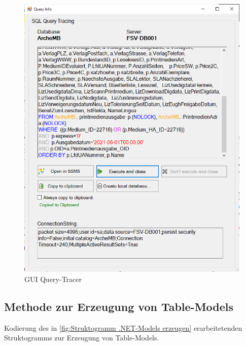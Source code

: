\documentclass[11pt,toc=sectionentrywithoutdots, 
headheight=44pt, headings=optiontoheadandtoc, hyperfootnotes=false, hypertexnames=false]{scrartcl}
\begin{document}
 \begin{figure}[H]
 \centering

	\includegraphics[scale=0.9]{gui.png}
	 \caption{GUI Query-Tracer}
 \end{figure}
 \clearpage
 
 \subsection{Methode zur Erzeugung von Table-Models}
Kodierung des in \ref{fig:Struktogramm .NET-Models erzeugen} erarbeitetenden Struktogramms zur Erzeugung von Table-Models. 
 \label{fig:Methode zur Erzeugung von Table-Models}
\end{document}
